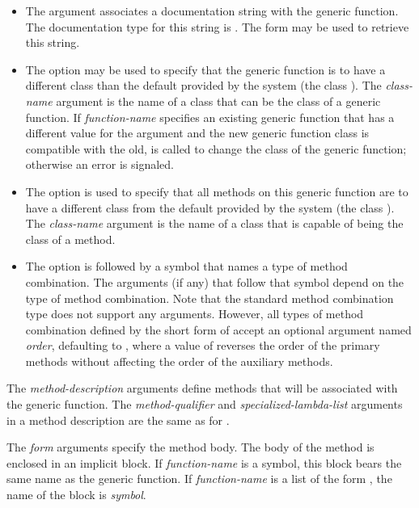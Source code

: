 \begin{defmac}
\begin{itemize}
\item  
The  argument associates a documentation string
with the generic function.  The documentation type for this string is
.  The form  may be used to retrieve this
string.

\item  
The  option may be used to specify that
the generic function is to have a different class than the default
provided by the system (the class ).
The {\it class-name\/} argument is the name of a class that can be the
class of a generic function.  If {\it function-name\/} specifies
an existing generic function that has a different value for the 
 argument and the new generic function class
is compatible with the old,  is called to change the
class of the generic function; otherwise an error is signaled.

\item  
The  option is used to specify that all methods on
this generic function are to have a different class from the default
provided by the system (the class ).  The {\it
class-name\/} argument is the name of a class that is capable of being
the class of a method.

\item  
The  option is followed by a symbol that
names a type of method combination.  The arguments (if any) that
follow that symbol depend on the type of method combination.  Note
that the standard method combination type does not support any
arguments.  However, all types of method combination defined by the
short form of  accept an optional
argument named {\it order\/}, defaulting to 
, where a value of  reverses
the order of the primary methods without affecting the order of the
auxiliary methods.

\end{itemize}

The {\it method-description\/} arguments define methods that will
be associated with the generic function.  The {\it method-qualifier}
and {\it specialized-lambda-list} arguments in a method description
are the same as for .

The {\it form\/} arguments specify the method body.  The body of the
method is enclosed in an implicit block.  If {\it
function-name\/} is a symbol, this block bears the same name as
the generic function.  If {\it function-name\/} is a list of the
form , the name of the block is {\it
symbol}.  



\end{defmac}

